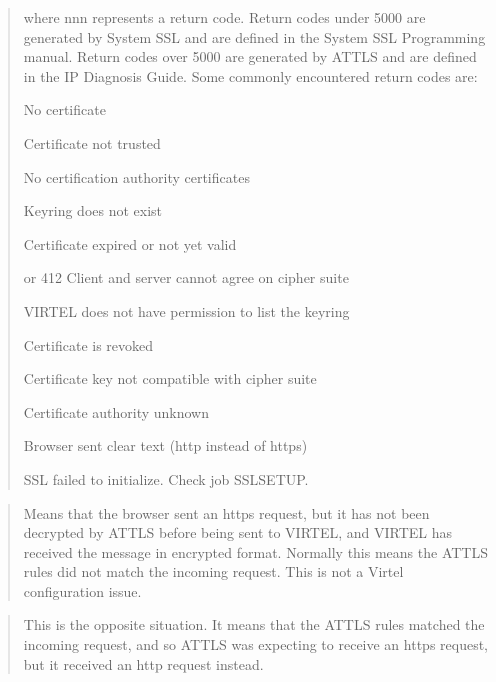 \documentclass[letterpaper,10pt,english]{sphinxmanual}
\begin{document}
\sphinxAtStartPar
{}
\begin{quote}

\sphinxAtStartPar
where nnn represents a return code. Return codes under 5000 are generated by System SSL and are defined in the System SSL Programming manual. Return codes over 5000 are generated by AT\sphinxhyphen{}TLS and are defined in the IP Diagnosis Guide. Some commonly encountered return codes are:

   No certificate

   Certificate not trusted

 No certification authority certificates

 Keyring does not exist

 Certificate expired or not yet valid

 or 412 Client and server cannot agree on cipher suite

 VIRTEL does not have permission to list the keyring

 Certificate is revoked

 Certificate key not compatible with cipher suite

 Certificate authority unknown

 Browser sent clear text (http instead of https)

 SSL failed to initialize. Check job SSLSETUP.
\end{quote}

\sphinxAtStartPar
{}
\begin{quote}

\sphinxAtStartPar
Means that the browser sent an https request, but it has not been decrypted by AT\sphinxhyphen{}TLS before being sent to VIRTEL, and VIRTEL has received the message in encrypted format. Normally this means the AT\sphinxhyphen{}TLS rules did not match the incoming request. This is not a Virtel configuration issue.
\end{quote}

\sphinxAtStartPar
{}
\begin{quote}

\sphinxAtStartPar
This is the opposite situation. It means that the AT\sphinxhyphen{}TLS rules matched the incoming request, and so AT\sphinxhyphen{}TLS was expecting to receive an https request, but it received an http request instead.
\end{quote}
\end{document}
